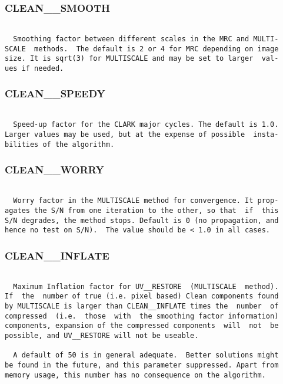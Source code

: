\subsubsection{CLEAN\_\_SMOOTH}
\begin{verbatim}

  Smoothing factor between different scales in the MRC and MULTI-
SCALE  methods.  The default is 2 or 4 for MRC depending on image
size. It is sqrt(3) for MULTISCALE and may be set to larger  val-
ues if needed.

\end{verbatim}
\subsubsection{CLEAN\_\_SPEEDY}
\begin{verbatim}

  Speed-up factor for the CLARK major cycles. The default is 1.0.
Larger values may be used, but at the expense of possible  insta-
bilities of the algorithm.

\end{verbatim}
\subsubsection{CLEAN\_\_WORRY}
\begin{verbatim}

  Worry factor in the MULTISCALE method for convergence. It prop-
agates the S/N from one iteration to the other, so that  if  this
S/N degrades, the method stops. Default is 0 (no propagation, and
hence no test on S/N).  The value should be < 1.0 in all cases.

\end{verbatim}
\subsubsection{CLEAN\_\_INFLATE}
\begin{verbatim}

  Maximum Inflation factor for UV__RESTORE  (MULTISCALE  method).
If  the  number of true (i.e. pixel based) Clean components found
by MULTISCALE is larger than CLEAN__INFLATE times the  number  of
compressed  (i.e.  those  with  the smoothing factor information)
components, expansion of the compressed components  will  not  be
possible, and UV__RESTORE will not be useable.

  A default of 50 is in general adequate.  Better solutions might
be found in the future, and this parameter suppressed. Apart from
memory usage, this number has no consequence on the algorithm.

\end{verbatim}
